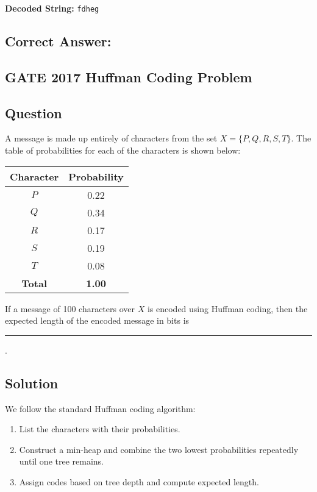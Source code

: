 \documentclass[14pt]{extarticle}
\begin{document}
\textbf{Decoded String:} \texttt{fdheg}

\subsection*{Correct Answer:} 

\subsection{GATE 2017 Huffman Coding Problem}
\subsection*{Question}
A message is made up entirely of characters from the set $X = \{P, Q, R, S, T\}$. The table of probabilities for each of the characters is shown below:

\begin{center}
\begin{tabular}{|c|c|}
\hline
\textbf{Character} & \textbf{Probability} \\
\hline
$P$ & 0.22 \\
$Q$ & 0.34 \\
$R$ & 0.17 \\
$S$ & 0.19 \\
$T$ & 0.08 \\
\hline
\textbf{Total} & \textbf{1.00} \\
\hline
\end{tabular}
\end{center}

If a message of 100 characters over $X$ is encoded using Huffman coding, then the expected length of the encoded message in bits is \rule{2cm}{0.15mm}.

\subsection*{Solution}

We follow the standard Huffman coding algorithm:

\begin{enumerate}
    \item List the characters with their probabilities.
    \item Construct a min-heap and combine the two lowest probabilities repeatedly until one tree remains.
    \item Assign codes based on tree depth and compute expected length.
\end{enumerate}
\end{document}
